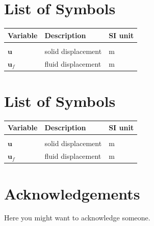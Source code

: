 \documentclass{report}
\begin{document}
\chapter*{List of Symbols} %
\begin{table}[H]
    \centering
    \begin{tabular}{lll}
        \textbf{Variable} & \textbf{Description} & \textbf{SI unit} \\\hline\\[-9px]
        $\bm{u}$ & solid displacement & m \\[2px]
        $\bm{u}_f$ & fluid displacement & m \\[2px]
    \end{tabular}
\end{table}

\chapter*{List of Symbols} %
\begin{table}[H]
    \centering
    \begin{tabular}{lll}
        \textbf{Variable} & \textbf{Description} & \textbf{SI unit} \\\hline\\[-9px]
        $\bm{u}$ & solid displacement & m \\[2px]
        $\bm{u}_f$ & fluid displacement & m \\[2px]
    \end{tabular}
\end{table}

\chapter*{Acknowledgements}
Here you might want to acknowledge someone.

\cleardoublepage
\end{document}
